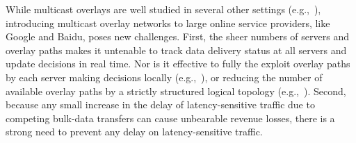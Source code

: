 While multicast overlays are well studied in several other settings
(e.g.,~\cite{Liebeherr2002Application,Wang2007mTreebone,
Andreev2013Designing,Mokhtarian2015Minimum}), introducing multicast overlay networks
to large online  service providers,
like Google and Baidu, poses new challenges.
First, the sheer numbers of servers and overlay paths makes
it untenable to track data delivery status at all servers and
update decisions in real time.
Nor is it effective to fully the exploit
overlay paths by each server making decisions locally
(e.g.,~\cite{kostic2003bullet,Repantis2010Scaling}),
or reducing the number of available overlay paths by a
strictly structured logical topology
(e.g.,~\cite{Nygren2010The}).
Second, because any small increase in the delay of
latency-sensitive traffic due to competing bulk-data transfers
 can cause unbearable revenue losses,
there is a strong need to prevent any delay on
latency-sensitive traffic.




